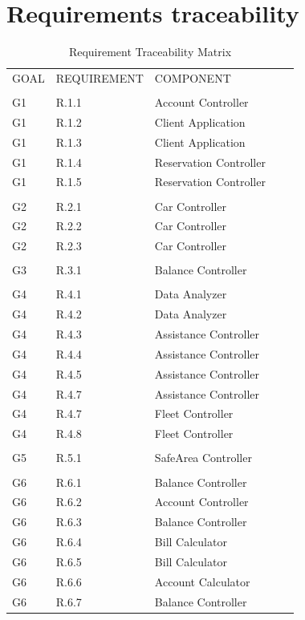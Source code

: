 \documentclass{article}
\begin{document}
\begin{figure}[ht]
\end{figure}
\newpage
\section{Requirements traceability}
\begin{table}[H]
\centering
\caption{Requirement Traceability Matrix}
\label{my-label}
\begin{tabular}{lllll}
\\
GOAL & REQUIREMENT & COMPONENT\\
\\
G1 & R.1.1 & Account Controller\\
G1 & R.1.2 & Client Application   \\
G1 & R.1.3 & Client Application   \\
G1 & R.1.4 & Reservation Controller \\ 
G1 & R.1.5 & Reservation Controller \\
\\
G2 & R.2.1 & Car Controller \\
G2 & R.2.2 & Car Controller \\
G2 & R.2.3 & Car Controller \\
\\
G3 & R.3.1 & Balance Controller \\
\\
G4 & R.4.1 & Data Analyzer \\
G4 & R.4.2 & Data Analyzer \\
G4 & R.4.3 & Assistance Controller \\
G4 & R.4.4 & Assistance Controller \\
G4 & R.4.5 & Assistance Controller \\
G4 & R.4.7 & Assistance Controller \\
G4 & R.4.7 & Fleet Controller \\
G4 & R.4.8 & Fleet Controller \\
\\
G5 & R.5.1 & SafeArea Controller \\
\\
G6 & R.6.1 & Balance Controller \\
G6 & R.6.2 & Account Controller \\
G6 & R.6.3 & Balance Controller \\
G6 & R.6.4 & Bill Calculator \\
G6 & R.6.5 & Bill Calculator \\
G6 & R.6.6 & Account Calculator \\
G6 & R.6.7 & Balance Controller \\
\end{tabular}
\end{table}
\newpage
\end{document}

